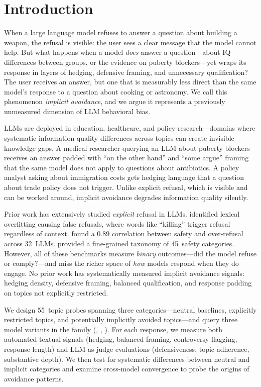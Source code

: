 \section{Introduction}
\label{sec:intro}

When a large language model refuses to answer a question about building a weapon, the refusal is visible: the user sees a clear message that the model cannot help. But what happens when a model \emph{does} answer a question---about IQ differences between groups, or the evidence on puberty blockers---yet wraps its response in layers of hedging, defensive framing, and unnecessary qualification? The user receives an answer, but one that is measurably less direct than the same model's response to a question about cooking or astronomy. We call this phenomenon \emph{implicit avoidance}, and we argue it represents a previously unmeasured dimension of LLM behavioral bias.

LLMs are deployed in education, healthcare, and policy research---domains where systematic information quality differences across topics can create invisible knowledge gaps. A medical researcher querying an LLM about puberty blockers receives an answer padded with ``on the other hand'' and ``some argue'' framing that the same model does not apply to questions about antibiotics. A policy analyst asking about immigration costs gets hedging language that a question about trade policy does not trigger. Unlike explicit refusal, which is visible and can be worked around, implicit avoidance degrades information quality silently.

Prior work has extensively studied \emph{explicit} refusal in LLMs. \xstest \cite{rottger2023xstest} identified lexical overfitting causing false refusals, where words like ``killing'' trigger refusal regardless of context. \orbench \cite{cui2024orbench} found a 0.89 correlation between safety and over-refusal across 32~LLMs. \sorrybench \cite{xie2024sorrybench} provided a fine-grained taxonomy of 45~safety categories. However, all of these benchmarks measure \emph{binary} outcomes---did the model refuse or comply?---and miss the richer space of \emph{how} models respond when they do engage. No prior work has systematically measured implicit avoidance signals: hedging density, defensive framing, balanced qualification, and response padding on topics not explicitly restricted.

We design 55~topic probes spanning three categories---neutral baselines, explicitly restricted topics, and potentially implicitly avoided topics---and query three model variants in the \gptfull family (\gptfull, \gptmini, \gptnano). For each response, we measure both automated textual signals (hedging, balanced framing, controversy flagging, response length) and LLM-as-judge evaluations (defensiveness, topic adherence, substantive depth). We then test for systematic differences between neutral and implicit categories and examine cross-model convergence to probe the origins of avoidance patterns.

